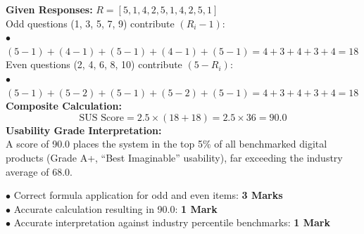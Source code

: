 \begin{solutionbox}
\textbf{Given Responses:} $R = [5, 1, 4, 2, 5, 1, 4, 2, 5, 1]$\\
Odd questions (1, 3, 5, 7, 9) contribute $(R_i - 1)$:\\
$\bullet$ $(5-1) + (4-1) + (5-1) + (4-1) + (5-1) = 4 + 3 + 4 + 3 + 4 = 18$\\
Even questions (2, 4, 6, 8, 10) contribute $(5 - R_i)$:\\
$\bullet$ $(5-1) + (5-2) + (5-1) + (5-2) + (5-1) = 4 + 3 + 4 + 3 + 4 = 18$\\
\textbf{Composite Calculation:}
\[
\text{SUS Score} = 2.5 \times (18 + 18) = 2.5 \times 36 = \mathbf{90.0}
\]
\textbf{Usability Grade Interpretation:}\\
A score of 90.0 places the system in the top 5\% of all benchmarked digital products (Grade A+, ``Best Imaginable'' usability), far exceeding the industry average of 68.0.
\begin{markingrubric}
$\bullet$ Correct formula application for odd and even items: \textbf{3 Marks}\\
$\bullet$ Accurate calculation resulting in 90.0: \textbf{1 Mark}\\
$\bullet$ Accurate interpretation against industry percentile benchmarks: \textbf{1 Mark}
\end{markingrubric}
\end{solutionbox}
